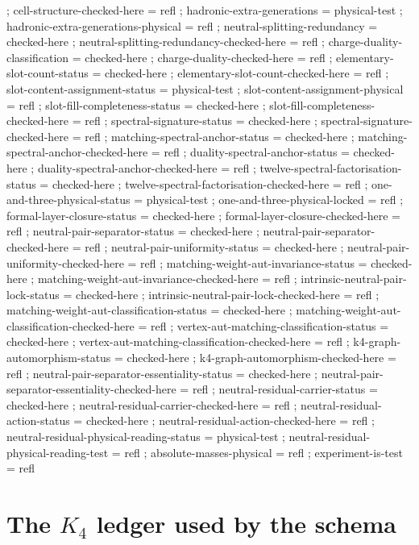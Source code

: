 \documentclass[11pt]{article}
\begin{document}
\begin{code}
{  ; cell-structure-checked-here = refl
  ; hadronic-extra-generations = physical-test
  ; hadronic-extra-generations-physical = refl
  ; neutral-splitting-redundancy = checked-here
  ; neutral-splitting-redundancy-checked-here = refl
  ; charge-duality-classification = checked-here
  ; charge-duality-checked-here = refl
  ; elementary-slot-count-status = checked-here
  ; elementary-slot-count-checked-here = refl
  ; slot-content-assignment-status = physical-test
  ; slot-content-assignment-physical = refl
  ; slot-fill-completeness-status = checked-here
  ; slot-fill-completeness-checked-here = refl
  ; spectral-signature-status = checked-here
  ; spectral-signature-checked-here = refl
  ; matching-spectral-anchor-status = checked-here
  ; matching-spectral-anchor-checked-here = refl
  ; duality-spectral-anchor-status = checked-here
  ; duality-spectral-anchor-checked-here = refl
  ; twelve-spectral-factorisation-status = checked-here
  ; twelve-spectral-factorisation-checked-here = refl
  ; one-and-three-physical-status = physical-test
  ; one-and-three-physical-locked = refl
  ; formal-layer-closure-status = checked-here
  ; formal-layer-closure-checked-here = refl
  ; neutral-pair-separator-status = checked-here
  ; neutral-pair-separator-checked-here = refl
  ; neutral-pair-uniformity-status = checked-here
  ; neutral-pair-uniformity-checked-here = refl
  ; matching-weight-aut-invariance-status = checked-here
  ; matching-weight-aut-invariance-checked-here = refl
  ; intrinsic-neutral-pair-lock-status = checked-here
  ; intrinsic-neutral-pair-lock-checked-here = refl
  ; matching-weight-aut-classification-status = checked-here
  ; matching-weight-aut-classification-checked-here = refl
  ; vertex-aut-matching-classification-status = checked-here
  ; vertex-aut-matching-classification-checked-here = refl
  ; k4-graph-automorphism-status = checked-here
  ; k4-graph-automorphism-checked-here = refl
  ; neutral-pair-separator-essentiality-status = checked-here
  ; neutral-pair-separator-essentiality-checked-here = refl
  ; neutral-residual-carrier-status = checked-here
  ; neutral-residual-carrier-checked-here = refl
  ; neutral-residual-action-status = checked-here
  ; neutral-residual-action-checked-here = refl
  ; neutral-residual-physical-reading-status = physical-test
  ; neutral-residual-physical-reading-test = refl
  ; absolute-masses-physical     = refl
  ; experiment-is-test           = refl
  }
\end{code}

\section{The \texorpdfstring{$K_4$}{K4} ledger used by the schema}
\end{document}
